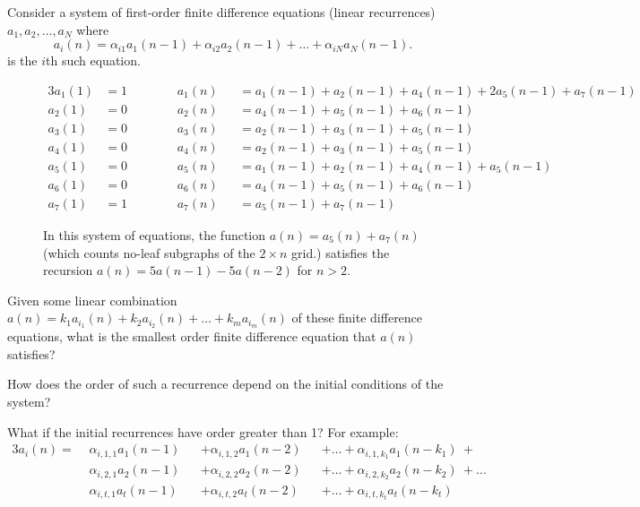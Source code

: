 \documentclass{article}
\begin{document}

Consider a system of first-order finite difference equations (linear recurrences)
$a_1, a_2, \hdots, a_N$ where \[
  a_i(n) = \alpha_{i1}a_1(n - 1) + \alpha_{i2}a_2(n - 1) + \hdots + \alpha_{iN}a_N(n - 1).
\] is the $i$th such equation.
% 
\begin{figure}[ht!]
  \centering
  \begin{alignat*}{3}
    a_1(1) &= 1 \hspace{1cm} && a_1(n) &&= a_1(n - 1) + a_2(n - 1) + a_4(n - 1) + 2a_5(n - 1) + a_7(n - 1) \\
    a_2(1) &= 0 \hspace{1cm} && a_2(n) &&= a_4(n - 1) + a_5(n - 1) + a_6(n - 1) \\
    a_3(1) &= 0 \hspace{1cm} && a_3(n) &&= a_2(n - 1) + a_3(n - 1) + a_5(n - 1) \\
    a_4(1) &= 0 \hspace{1cm} && a_4(n) &&= a_2(n - 1) + a_3(n - 1) + a_5(n - 1) \\
    a_5(1) &= 0 \hspace{1cm} && a_5(n) &&= a_1(n - 1) + a_2(n - 1) + a_4(n - 1) + a_5(n - 1) \\
    a_6(1) &= 0 \hspace{1cm} && a_6(n) &&= a_4(n - 1) + a_5(n - 1) + a_6(n - 1) \\
    a_7(1) &= 1 \hspace{1cm} && a_7(n) &&= a_5(n - 1) + a_7(n - 1)
  \end{alignat*}
  \caption{
    In this system of equations, the function $a(n) = a_5(n) + a_7(n)$
    (which counts no-leaf subgraphs of the $2 \times n$ grid.)
    satisfies the recursion $a(n) = 5a(n-1) - 5a(n-2)$ for $n > 2$.
  }
\end{figure}
\begin{question}
  Given some linear combination
    $a(n) = k_1a_{i_1}(n) + k_2a_{i_2}(n) + \hdots + k_ma_{i_m}(n)$
  of these finite difference equations,
  what is the smallest order finite difference equation that $a(n)$ satisfies?
\end{question}

\begin{related}
  \item How does the order of such a recurrence depend on the initial conditions
    of the system?
  \item What if the initial recurrences have order greater than 1?
  For example:
  \begin{alignat*}{3}
    a_i(n) = \,\,
    & \alpha_{i,1,1}a_1(n - 1) &&+ \alpha_{i,1,2}a_1(n - 2) &&+ \hdots + \alpha_{i,1,k_1}a_1(n - k_1)\ + \\
    & \alpha_{i,2,1}a_2(n - 1) &&+ \alpha_{i,2,2}a_2(n - 2) &&+ \hdots + \alpha_{i,2,k_2}a_2(n - k_2)\ + \hdots \\
    & \alpha_{i,t,1}a_t(n - 1) &&+ \alpha_{i,t,2}a_t(n - 2) &&+ \hdots + \alpha_{i,t,k_t}a_t(n - k_t)
  \end{alignat*}
\end{related}
\end{document}
